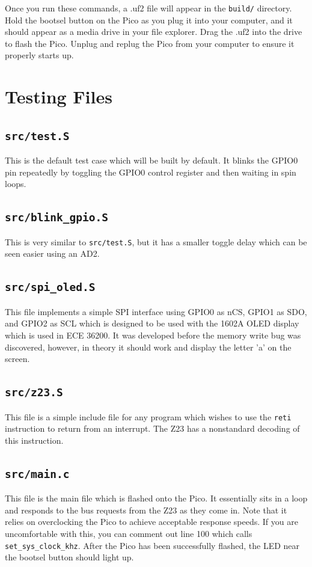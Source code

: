 \documentclass[10pt]{article}
\begin{document}
Once you run these commands, a .uf2 file will appear in the \verb|build/| directory. Hold the
bootsel button on the Pico as you plug it into your computer, and it should appear as a media drive
in your file explorer. Drag the .uf2 into the drive to flash the Pico. Unplug and replug the Pico
from your computer to ensure it properly starts up.

\section{Testing Files}

\subsection{\texttt{src/test.S}}
This is the default test case which will be built by default. It blinks the GPIO0 pin repeatedly by
toggling the GPIO0 control register and then waiting in spin loops.\\

\subsection{\texttt{src/blink\_gpio.S}}
This is very similar to \verb|src/test.S|, but it has a smaller toggle delay which can be seen
easier using an AD2.\\

\subsection{\texttt{src/spi\_oled.S}}
This file implements a simple SPI interface using GPIO0 as nCS, GPIO1 as SDO, and GPIO2 as SCL which
is designed to be used with the 1602A OLED display which is used in ECE 36200. It was developed
before the memory write bug was discovered, however, in theory it should work and display the letter
'a' on the screen.

\subsection{\texttt{src/z23.S}}
This file is a simple include file for any program which wishes to use the \verb|reti| instruction
to return from an interrupt. The Z23 has a nonstandard decoding of this instruction.

\subsection{\texttt{src/main.c}}
This file is the main file which is flashed onto the Pico. It essentially sits in a loop and
responds to the bus requests from the Z23 as they come in. Note that it relies on overclocking the
Pico to achieve acceptable response speeds. If you are uncomfortable with this, you can comment out
line 100 which calls \verb|set_sys_clock_khz|. After the Pico has been successfully flashed, the LED
near the bootsel button should light up.
\end{document}
